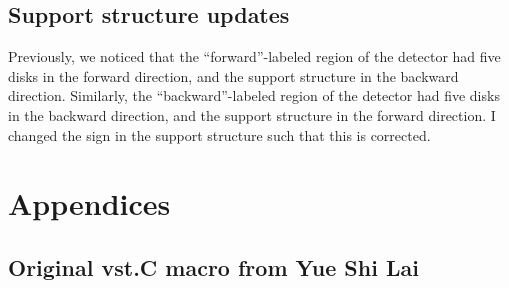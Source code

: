 \documentclass[12pt]{article}
\begin{document}
\subsection{Support structure updates}

Previously, we noticed that the ``forward''-labeled region of the detector had five disks in the forward direction, and the support structure in the backward direction.
Similarly, the ``backward''-labeled region of the detector had five disks in the backward direction, and the support structure in the forward direction.
I changed the sign in the support structure such that this is corrected.





































\pagebreak
\appendix
\section{Appendices}
\subsection{Original vst.C macro from Yue Shi Lai}
\end{document}
